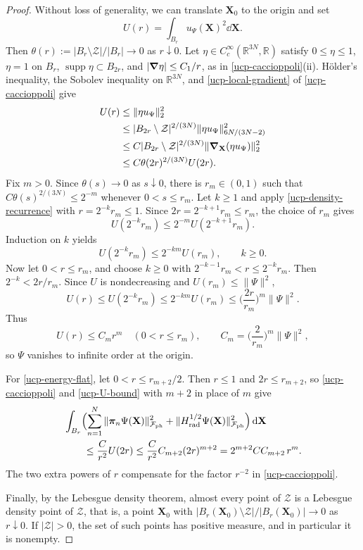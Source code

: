 \documentclass[final,reqno]{amsart}
\DeclareMathOperator{\supp}{supp}
\theoremstyle{remark}
\newcommand{\RR}{\mathbb{R}}
\newcommand{\ph}{\mathrm{ph}}
\newcommand{\rad}{\mathrm{rad}}
\newcommand{\Fock}{\mathcal{F}}
\newcommand{\vpi}{{\bm{\pi}}}
\newcommand{\vX}{{\mathbf{X}}}
\begin{document}
\begin{proof}
Without loss of generality, we can translate $\vX_0$ to the
origin and set
\[
 U(r)=\int_{B_r}u_\Psi(\vX)^2\dd\vX.
\]
Then $\theta(r):=|B_r\setminus \mathcal Z|/|B_r|\to0$ as $r\downarrow0$.
Let $\eta\in C_c^\infty(\RR^{3N},\RR)$ satisfy $0\leq\eta\leq1$, $\eta=1$ on
$B_r$, $\supp\eta\subset B_{2r}$, and $|\grad\eta|\leq C_1/r$, as in
\cref{ucp-caccioppoli}(ii).  H\"older's inequality,
the Sobolev inequality on $\RR^{3N}$, and
\cref{ucp-local-gradient} of \cref{ucp-caccioppoli} give
\begin{align}
 U(r)&\leq\|\eta u_\Psi\|_2^2\notag\\
 &\leq |B_{2r}\setminus \mathcal Z|^{2/(3N)}
                  \|\eta u_\Psi\|_{6N/(3N-2)}^2\notag\\
 &\leq C|B_{2r}\setminus \mathcal Z|^{2/(3N)}
                  \|\grad_{\vX}(\eta u_\Psi)\|_2^2\notag\\
 &\leq C\theta(2r)^{2/(3N)}U(2r).
 \label{ucp-density-recurrence}
\end{align}
Fix $m>0$.  Since $\theta(s)\to0$ as $s\downarrow0$, there is
$r_m\in(0,1)$ such that $C\theta(s)^{2/(3N)}\leq2^{-m}$ whenever
$0<s\leq r_m$.  Let $k\geq1$ and apply \cref{ucp-density-recurrence}
with $r=2^{-k}r_m\leq1$.  Since $2r=2^{-k+1}r_m\leq r_m$, the choice
of $r_m$ gives
\[
 U(2^{-k}r_m)\leq2^{-m}U(2^{-k+1}r_m).
\]
Induction on $k$ yields
\[
 U(2^{-k}r_m)\leq2^{-km}U(r_m),\qquad k\geq0.
\]
Now let $0<r\leq r_m$, and choose $k\geq0$ with
$2^{-k-1}r_m<r\leq2^{-k}r_m$.  Then $2^{-k}<2r/r_m$.  Since $U$ is
nondecreasing and $U(r_m)\leq\|\Psi\|^2$,
\[
 U(r)\leq U(2^{-k}r_m)\leq2^{-km}U(r_m)
 \leq\Big(\frac{2r}{r_m}\Big)^m\|\Psi\|^2.
\]
Thus
\begin{equation}\label{ucp-U-bound}
 U(r)\leq C_mr^m\quad(0<r\leq r_m),\qquad
 C_m=\Big(\frac{2}{r_m}\Big)^m\|\Psi\|^2,
\end{equation}
so $\Psi$ vanishes to infinite order at the origin.

For \cref{ucp-energy-flat}, let $0<r\leq r_{m+2}/2$.  Then $r\leq1$
and $2r\leq r_{m+2}$, so \cref{ucp-caccioppoli} and \cref{ucp-U-bound}
with $m+2$ in place of $m$ give
\begin{align*}
 &\int_{B_r}\Bigl(\sum_{n=1}^N\|\vpi_n\Psi(\vX)\|_{\Fock_\ph}^2
   +\|H_\rad^{1/2}\Psi(\vX)\|_{\Fock_\ph}^2\Bigr)\dd\vX\\
 &\qquad\leq\frac{C}{r^2}U(2r)
 \leq\frac{C}{r^2}C_{m+2}(2r)^{m+2}
 =2^{m+2}CC_{m+2}\,r^m.
\end{align*}
The two extra powers of $r$ compensate for the factor $r^{-2}$ in
\cref{ucp-caccioppoli}.

Finally, by the Lebesgue density theorem, almost every point of $\mathcal Z$
is a Lebesgue density point of $\mathcal Z$, that is, a point $\vX_0$ with
$|B_r(\vX_0)\setminus \mathcal Z|/|B_r(\vX_0)|\to0$ as $r\downarrow0$.  If
$|\mathcal Z|>0$, the set of such points has positive measure, and in
particular it is nonempty.
\end{proof}
\end{document}
